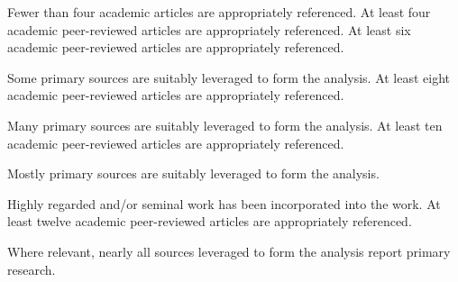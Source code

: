 \documentclass{../../fal_assignment}
\begin{document}
\rubricyeartwo

\begin{markingrubric}
%
%
%
%
        \grade\fail	Fewer than four academic articles are appropriately referenced.
        \grade		At least four academic peer-reviewed articles are appropriately referenced.
        \grade		At least six academic peer-reviewed articles are appropriately referenced.
        \par 		Some primary sources are suitably leveraged to form the analysis.
        \grade		At least eight academic peer-reviewed articles are appropriately referenced.
        \par 		Many primary sources are suitably leveraged to form the analysis.
        \grade		At least ten academic peer-reviewed articles are appropriately referenced.
        \par 		Mostly primary sources are suitably leveraged to form the analysis.
        \par 		Highly regarded and/or seminal work has been incorporated into the work.
        \grade		At least twelve academic peer-reviewed articles are appropriately referenced.
        \par 		Where relevant, nearly all sources leveraged to form the analysis report primary research.

\end{markingrubric}
\end{document}
